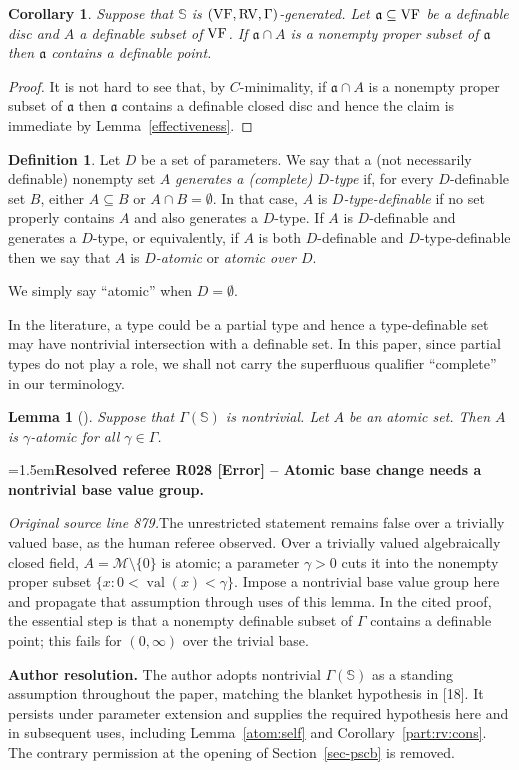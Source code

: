 \documentclass[12pt]{amsart}
\newcommand{\ResolvedRefereeRemark}[5]{%
  \par\medskip\begingroup\normalfont\small\color{gray}%
  \emergencystretch=1.5em\noindent\textbf{Resolved referee R#1 [#2] -- #3.}\par\nobreak\noindent #4\par
  \medskip\color{ResolutionGreen}\noindent\textbf{Author resolution.} #5\par
  \endgroup\medskip
}
\newcommand{\memph}[1]{{\color{magenta}\emph{#1}}}
\theoremstyle{plain}
\newtheorem{cor}[thm]{Corollary}
\newtheorem{lem}[thm]{Lemma}
\theoremstyle{definition}
\newtheorem{defn}[thm]{Definition}
\theoremstyle{remark}
\numberwithin{equation}{section}
\theoremstyle{plain}
\newcommand{\VF}{\textup{VF}}
\newcommand{\RV}{\textup{RV}}
\newcommand{\MM}{\mdl M}
\newcommand{\cmin}{$C$\nobreakdash}
\newcommand{\ga}{\mathfrak{a}}
\newcommand{\0}{\emptyset}
\newcommand{\mdl}[1]{\mathcal{#1}}  %
\newcommand{\sub}{\subseteq}
\DeclareMathOperator{\vv}{val}
\begin{document}
\begin{cor}\label{open:disc:def:point}
Suppose that $\mathbb{S}$ is $(\VF, \RV,\Gamma)$-generated.
Let $\ga \sub \VF$ be a definable disc and $A$ a definable subset of $\VF$. If $\ga \cap A$ is a nonempty proper subset of $\ga$ then $\ga$ contains a definable point.
\end{cor}
\begin{proof}
It is not hard to see that, by \cmin-minimality, if $\ga \cap A$ is a nonempty proper subset of $\ga$ then $\ga$ contains a definable closed disc and hence the claim is immediate by Lemma~\ref{effectiveness}.
\end{proof}

\begin{defn}
Let $D$ be a set of parameters. We say that a (not necessarily definable) nonempty set $A$ \memph{generates a (complete) $D$-type} if, for every $D$-definable set $B$, either $A \sub B$ or $A \cap B = \0$. In that case, $A$ is \memph{$D$-type-definable} if no set properly contains $A$ and also generates a $D$-type. If $A$ is $D$-definable and generates a $D$-type, or equivalently, if $A$ is both $D$-definable and $D$-type-definable then we say that $A$ is \memph{$D$-atomic} or \memph{atomic over $D$}.
\end{defn}

We simply say ``atomic'' when $D =\0$.

In the literature, a type could be a partial type and hence a type-definable set may have nontrivial intersection with a definable set. In this paper, since partial types do not play a role, we shall not carry the superfluous qualifier ``complete'' in our terminology.

\begin{lem}[{\cite[Lemma~3.3]{Yin:int:acvf}}]\label{atomic:base:change}
Suppose that $\Gamma(\mathbb S)$ is nontrivial. Let $A$ be an atomic set. Then $A$ is $\gamma$-atomic for all $\gamma \in \Gamma$.
\end{lem}

\ResolvedRefereeRemark{028}{Error}{Atomic base change needs a nontrivial base value group}{%
\textit{Original source line 879.}\quad The unrestricted statement remains false over a trivially valued base, as the human referee observed. Over a trivially valued algebraically closed field, $A=\MM\setminus\{0\}$ is atomic; a parameter $\gamma>0$ cuts it into the nonempty proper subset $\{x:0<\vv(x)<\gamma\}$. Impose a nontrivial base value group here and propagate that assumption through uses of this lemma. In the cited proof, the essential step is that a nonempty definable subset of $\Gamma$ contains a definable point; this fails for $(0,\infty)$ over the trivial base.
}{The author adopts nontrivial $\Gamma(\mathbb S)$ as a standing assumption throughout the paper, matching the blanket hypothesis in [18]. It persists under parameter extension and supplies the required hypothesis here and in subsequent uses, including Lemma~\ref{atom:self} and Corollary~\ref{part:rv:cons}. The contrary permission at the opening of Section~\ref{sec-pscb} is removed.}
\end{document}
